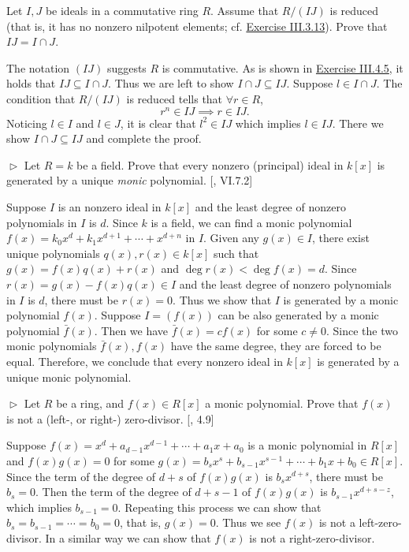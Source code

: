 \documentclass[12pt,letterpaper,boxed]{hmcpset}
\begin{document}
\begin{problem}[4.6]
	Let $I, J$ be ideals in a commutative ring $R$. Assume that $R/(IJ)$ is reduced (that is, it has no nonzero nilpotent elements; cf. \hyperlink{Exercise III.3.13}{Exercise III.3.13}). Prove that $IJ = I \cap J$.
\end{problem}
\begin{solution}
	The notation $(IJ)$ suggests $R$ is commutative. As is shown in \hyperlink{Exercise III.4.5}{Exercise III.4.5}, it holds that $IJ\subseteq I\cap J$. Thus we are left to show $I\cap J\subseteq IJ$. Suppose $l\in I\cap J$. The condition that $R/(IJ)$ is reduced tells that $\forall r\in R$, 
	\[
	r^n\in IJ\implies r\in IJ.
	\]
	Noticing $l\in I$ and $l\in J$, it is clear that $l^2\in IJ$ which implies $l\in IJ$. There we show $I\cap J\subseteq IJ$ and complete the proof. 
\end{solution}

\begin{problem}[4.7]
	$\vartriangleright$ Let $R = k$ be a field. Prove that every nonzero (principal) ideal in $k[x]$ is generated by a unique \emph{monic} polynomial. [, \textsection VI.7.2]
\end{problem}
\begin{solution}
    Suppose $I$ is an nonzero ideal in $k[x]$ and the least degree of nonzero polynomials in $I$ is $d$. Since $k$ is a field, we can find a monic polynomial $f(x)=k_0x^d+k_1x^{d+1}+\cdots+x^{d+n}$ in $I$. Given any $g(x)\in I$, there exist unique polynomials $q(x), r(x)\in k[x]$ such that $g(x) = f(x)q(x) + r(x)$ and $\deg r(x) < \deg f(x)=d$. Since $r(x)=g(x)-f(x)q(x)\in I$ and the least degree of nonzero polynomials in $I$ is $d$, there must be $r(x)=0$. Thus we show that $I$ is generated by a monic polynomial $f(x)$. Suppose $I=(f(x))$ can be also generated by a monic polynomial $\bar{f}(x)$. Then we have $\bar{f}(x)=cf(x)$ for some $c\ne0$. Since the two monic polynomials $\bar{f}(x),f(x)$ have the same degree, they are forced to be equal. Therefore, we conclude that every nonzero ideal in $k[x]$ is generated by a unique monic polynomial.
\end{solution}

\begin{problem}[4.8]
	$\vartriangleright$ Let $R$ be a ring, and $f(x)\in R[x]$ a monic polynomial. Prove that $f(x)$ is not a (left-, or right-) zero-divisor. [, 4.9]
\end{problem}
\begin{solution}
	Suppose $f(x)=x^{d}+a_{d-1} x^{d-1}+\cdots+a_{1} x+a_{0}$ is a monic polynomial in $R[x]$ and $f(x)g(x)=0$ for some $g(x)=b_sx^{s}+b_{s-1} x^{s-1}+\cdots+b_{1} x+b_{0}\in R[x]$. Since the term of the degree of $d+s$ of $f(x)g(x)$ is $b_sx^{d+s}$, there must be $b_s=0$. Then the term of the degree of $d+s-1$ of $f(x)g(x)$ is $b_{s-1}x^{d+s-z}$, which implies $b_{s-1}=0$. Repeating this process we can show that $b_s=b_{s-1}=\cdots=b_0=0$, that is, $g(x)=0$. Thus we see $f(x)$ is not a left-zero-divisor. In a similar way we can show that $f(x)$ is not a right-zero-divisor. 
\end{solution}
\end{document}
